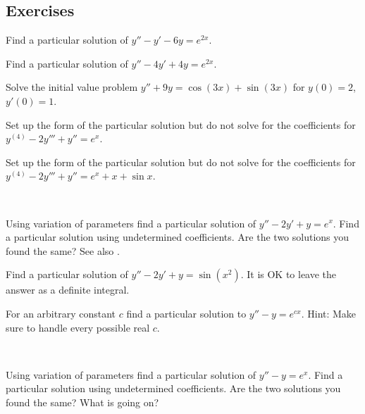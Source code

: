 \subsection{Exercises}

\begin{exercise}
Find a particular solution of
$y''-y' -6y = e^{2x}$.
\end{exercise}

\begin{exercise}
Find a particular solution of
$y''-4y' +4y = e^{2x}$.
\end{exercise}

\begin{exercise}
Solve the initial value problem
$y''+9y = \cos (3x) + \sin (3x)$ for $y(0) = 2$, $y'(0) = 1$.
\end{exercise}

\begin{exercise}
Set up the form of the particular solution but do not solve
for the coefficients for $y^{(4)}-2y'''+y'' = e^x$.
\end{exercise}

\begin{exercise}
Set up the form of the particular solution but do not solve
for the coefficients for $y^{(4)}-2y'''+y'' = e^x + x + \sin x$.
\end{exercise}

\begin{exercise}
{\ }
\begin{tasks}
\task Using variation of parameters find a particular solution of
$y''-2y'+y = e^x$.
\task Find a particular solution using undetermined
coefficients.
\task Are the two solutions you found the same?
See also .
\end{tasks}
\end{exercise}

\begin{exercise}
Find a particular solution of
$y''-2y' +y = \sin (x^2)$.  It is OK to leave the answer as a definite
integral.
\end{exercise}

\begin{exercise}
For an arbitrary constant $c$ find a particular solution
to $y''-y=e^{cx}$.  Hint: Make sure to handle every possible real $c$.
\end{exercise}

\begin{exercise} \label{exercise:diffvarparunder}
{\ }
\begin{tasks}
\task Using variation of parameters find a particular solution of
$y''-y = e^x$.
\task Find a particular solution using undetermined
coefficients.
\task Are the two solutions you found the same?
What is going on?
\end{tasks}
\end{exercise}

